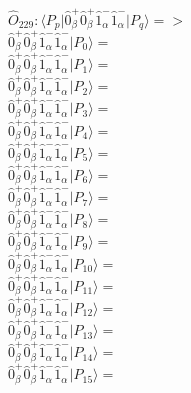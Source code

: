 \documentclass[14pt]{article}
\begin{document}
    $\hat{O}_{229}:  \langle{P_p}\vert \hat{0}_{\beta}^{+}\hat{0}_{\beta}^{+}\hat{1}_{\alpha}^{-}\hat{1}_{\alpha}^{-} \vert{P_q}\rangle => $ \\ 
    $ \hat{0}_{\beta}^{+}\hat{0}_{\beta}^{+}\hat{1}_{\alpha}^{-}\hat{1}_{\alpha}^{-} \vert{P_{0}}\rangle =  $ \\ 
    $ \hat{0}_{\beta}^{+}\hat{0}_{\beta}^{+}\hat{1}_{\alpha}^{-}\hat{1}_{\alpha}^{-} \vert{P_{1}}\rangle =  $ \\ 
    $ \hat{0}_{\beta}^{+}\hat{0}_{\beta}^{+}\hat{1}_{\alpha}^{-}\hat{1}_{\alpha}^{-} \vert{P_{2}}\rangle =  $ \\ 
    $ \hat{0}_{\beta}^{+}\hat{0}_{\beta}^{+}\hat{1}_{\alpha}^{-}\hat{1}_{\alpha}^{-} \vert{P_{3}}\rangle =  $ \\ 
    $ \hat{0}_{\beta}^{+}\hat{0}_{\beta}^{+}\hat{1}_{\alpha}^{-}\hat{1}_{\alpha}^{-} \vert{P_{4}}\rangle =  $ \\ 
    $ \hat{0}_{\beta}^{+}\hat{0}_{\beta}^{+}\hat{1}_{\alpha}^{-}\hat{1}_{\alpha}^{-} \vert{P_{5}}\rangle =  $ \\ 
    $ \hat{0}_{\beta}^{+}\hat{0}_{\beta}^{+}\hat{1}_{\alpha}^{-}\hat{1}_{\alpha}^{-} \vert{P_{6}}\rangle =  $ \\ 
    $ \hat{0}_{\beta}^{+}\hat{0}_{\beta}^{+}\hat{1}_{\alpha}^{-}\hat{1}_{\alpha}^{-} \vert{P_{7}}\rangle =  $ \\ 
    $ \hat{0}_{\beta}^{+}\hat{0}_{\beta}^{+}\hat{1}_{\alpha}^{-}\hat{1}_{\alpha}^{-} \vert{P_{8}}\rangle =  $ \\ 
    $ \hat{0}_{\beta}^{+}\hat{0}_{\beta}^{+}\hat{1}_{\alpha}^{-}\hat{1}_{\alpha}^{-} \vert{P_{9}}\rangle =  $ \\ 
    $ \hat{0}_{\beta}^{+}\hat{0}_{\beta}^{+}\hat{1}_{\alpha}^{-}\hat{1}_{\alpha}^{-} \vert{P_{10}}\rangle =  $ \\ 
    $ \hat{0}_{\beta}^{+}\hat{0}_{\beta}^{+}\hat{1}_{\alpha}^{-}\hat{1}_{\alpha}^{-} \vert{P_{11}}\rangle =  $ \\ 
    $ \hat{0}_{\beta}^{+}\hat{0}_{\beta}^{+}\hat{1}_{\alpha}^{-}\hat{1}_{\alpha}^{-} \vert{P_{12}}\rangle =  $ \\ 
    $ \hat{0}_{\beta}^{+}\hat{0}_{\beta}^{+}\hat{1}_{\alpha}^{-}\hat{1}_{\alpha}^{-} \vert{P_{13}}\rangle =  $ \\ 
    $ \hat{0}_{\beta}^{+}\hat{0}_{\beta}^{+}\hat{1}_{\alpha}^{-}\hat{1}_{\alpha}^{-} \vert{P_{14}}\rangle =  $ \\ 
    $ \hat{0}_{\beta}^{+}\hat{0}_{\beta}^{+}\hat{1}_{\alpha}^{-}\hat{1}_{\alpha}^{-} \vert{P_{15}}\rangle =  $ \\ 
    
\end{document}
